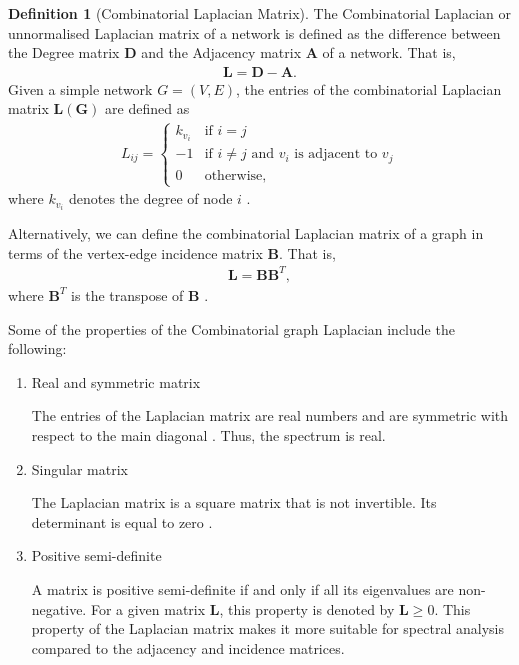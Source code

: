 \documentclass[10pt,a4paper]{article}
\theoremstyle{plain}
\theoremstyle{definition}
\newtheorem{defn}[subsection]{Definition}
\begin{document}
\begin{defn}[Combinatorial Laplacian Matrix]
	The Combinatorial Laplacian or unnormalised Laplacian matrix of a network is defined as the difference between the Degree matrix $\mathbf{D}$ and the Adjacency matrix $\mathbf{A}$ of a network. That is,
	\begin{eqnarray}
	\mathbf{L} = \mathbf{D} - \mathbf{A}.
	\end{eqnarray}
	Given a simple network $G=(V,E)$, the entries of the combinatorial Laplacian matrix $\mathbf{L(G)}$  are defined as
	\begin{eqnarray}
	L_{ij} = \begin{cases} k_{v_i} &\mbox{if } i = j \\
	-1 &\mbox{if } i \neq j \text{ and } v_i \text{ is adjacent to } v_j \\
	0 & \text{otherwise},
	\end{cases}
	\end{eqnarray}
	where $k_{v_i}$  denotes the degree of node $i$ \citep{estrada2011structure}.
	
	Alternatively, we can define the combinatorial Laplacian matrix of a graph in terms of the vertex-edge incidence matrix $\mathbf{B}$. That is,
	\begin{eqnarray}
	\mathbf{L} =  \mathbf{B} \mathbf{B}^T,
	\label{lintermsb}
	\end{eqnarray}
	where $\mathbf{B}^T$ is the transpose of $\mathbf{B}$ \citep{estrada2011structure}.
\end{defn}

Some of the properties of the Combinatorial graph Laplacian  include the following:
\begin{enumerate}	
	\item{Real and symmetric matrix} 
	
	The entries of the Laplacian matrix are real numbers and are symmetric with respect to the main diagonal \citep{das2004laplacian}. Thus, the spectrum is real.
	\item{Singular matrix}
	
	The Laplacian matrix is a square matrix that is not invertible. Its determinant is equal to zero \citep{das2004laplacian}.
	\item{Positive semi-definite}
	
	A matrix is positive semi-definite if and only if all its eigenvalues are non-negative. For a given matrix $\mathbf{L}$, this property is denoted by $\mathbf{L}\geq 0$. This property of the Laplacian matrix makes it more suitable for spectral analysis compared to the adjacency and incidence matrices.
	
\end{enumerate}
\end{document}
